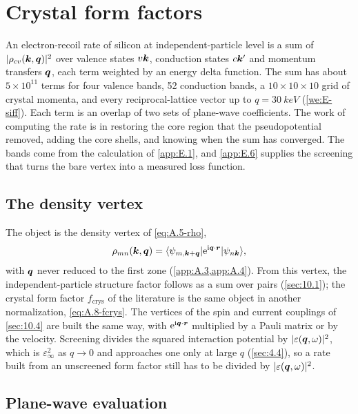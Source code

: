 \section{Crystal form factors}\label{app:E.7}

An electron-recoil rate of silicon at independent-particle level is a sum of $|\rho_{cv}(\bm{k},\bm{q})|^2$ over valence states $v\bm{k}$, conduction states $c\bm{k}'$ and momentum transfers $\bm{q}$, each term weighted by an energy delta function. The sum has about $5\times10^{11}$ terms for four valence bands, 52 conduction bands, a $10\times10\times10$ grid of crystal momenta, and every reciprocal-lattice vector up to $q = \SI{30}{keV}$ (\cref{we:E-siff}). Each term is an overlap of two sets of plane-wave coefficients. The work of computing the rate is in restoring the core region that the pseudopotential removed, adding the core shells, and knowing when the sum has converged. The bands come from the calculation of \cref{app:E.1}, and \cref{app:E.6} supplies the screening that turns the bare vertex into a measured loss function.

\subsection{The density vertex}

The object is the density vertex of \cref{eq:A.5-rho},
\begin{equation*}
  \rho_{mn}(\bm{k},\bm{q}) = \langle\psi_{m,\bm{k}+\bm{q}}|\mathrm{e}^{\mathrm{i}\bm{q}\cdot\bm{r}}|\psi_{n\bm{k}}\rangle ,
\end{equation*}
with $\bm{q}$ never reduced to the first zone (\cref{app:A.3,app:A.4}). From this vertex, the independent-particle structure factor follows as a sum over pairs (\cref{sec:10.1}); the crystal form factor $f_{\mathrm{crys}}$ of the literature is the same object in another normalization, \cref{eq:A.8-fcrys}. The vertices of the spin and current couplings of \cref{sec:10.4} are built the same way, with $\mathrm{e}^{\mathrm{i}\bm{q}\cdot\bm{r}}$ multiplied by a Pauli matrix or by the velocity. Screening divides the squared interaction potential by $|\varepsilon(\bm{q},\omega)|^2$, which is $\varepsilon_\infty^2$ as $q \to 0$ and approaches one only at large $q$ (\cref{sec:4.4}), so a rate built from an unscreened form factor still has to be divided by $|\varepsilon(\bm{q},\omega)|^2$.

\subsection{Plane-wave evaluation}

